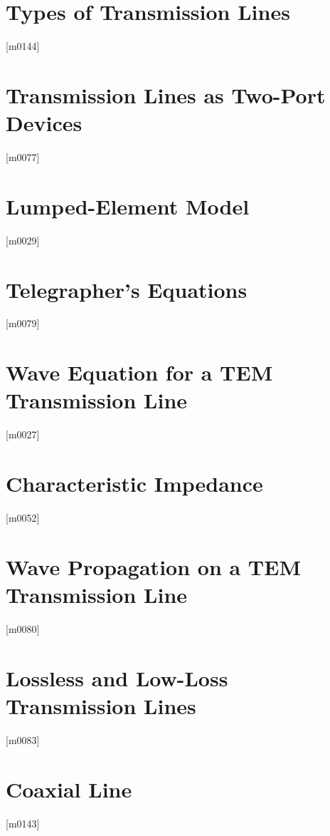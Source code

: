 \documentclass[10pt,letterpaper,twocolumn,openany]{book}
\theoremstyle{definition} %
\begin{document}
    \section{Types of Transmission Lines}
{\color{blue}\tiny[m0144]}      
      \vfill\break
    \section{Transmission Lines as Two-Port Devices}
{\color{blue}\tiny[m0077]}      
      \vfill\break
    \section{Lumped-Element Model}
{\color{blue}\tiny[m0029]}      
      \vfill\break
    \section{Telegrapher's Equations}
{\color{blue}\tiny[m0079]}      
      \vfill\break
    \section{Wave Equation for a TEM Transmission Line}
{\color{blue}\tiny[m0027]}      
      \vfill\break
    \section{Characteristic Impedance}
{\color{blue}\tiny[m0052]}      
      \vfill\break
    \section{Wave Propagation on a TEM Transmission Line}
{\color{blue}\tiny[m0080]}      
      \vfill\break
    \section{Lossless and Low-Loss Transmission Lines}
{\color{blue}\tiny[m0083]}      
      \vfill\break
    \section{Coaxial Line}
{\color{blue}\tiny[m0143]}      
      \vfill\break
\end{document}
